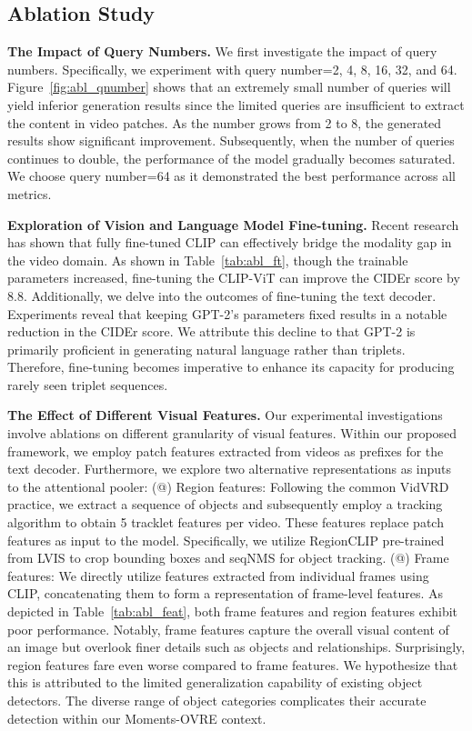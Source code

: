 \documentclass[letterpaper]{article}
\makeatletter
\newcommand{\Rmnum}[1]{\expandafter\@slowromancap\romannumeral #1@}
\makeatother
\begin{document}
\subsection{Ablation Study}
\noindent \textbf{The Impact of Query Numbers. }
We first investigate the impact of query numbers.
Specifically, we experiment with query number=2, 4, 8, 16, 32, and 64.
Figure~\ref{fig:abl_qnumber} shows that an extremely small number of queries will yield inferior generation results since the limited queries are insufficient to extract the content in video patches.
As the number grows from 2 to 8, the generated results show significant improvement.
Subsequently, when the number of queries continues to double, the performance of the model gradually becomes saturated. We choose query number=64 as it demonstrated the best performance across all metrics.

\noindent \textbf{Exploration of Vision and Language Model Fine-tuning.}
Recent research~\cite{Rasheed2023vificlip} has shown that fully fine-tuned CLIP can effectively bridge the modality gap in the video domain.
As shown in Table~\ref{tab:abl_ft}, though the trainable parameters increased, fine-tuning the CLIP-ViT can improve the CIDEr score by 8.8.
Additionally, we delve into the outcomes of fine-tuning the text decoder. Experiments reveal that keeping GPT-2's parameters fixed results in a notable reduction in the CIDEr score. We attribute this decline to that GPT-2 is primarily proficient in generating natural language rather than triplets. Therefore, fine-tuning becomes imperative to enhance its capacity for producing rarely seen triplet sequences.

\noindent \textbf{The Effect of Different Visual Features.}
Our experimental investigations involve ablations on different granularity of visual features. Within our proposed framework, we employ patch features extracted from videos as prefixes for the text decoder. Furthermore, we explore two alternative representations as inputs to the attentional pooler:
(\Rmnum{1}) Region features: Following the common VidVRD practice, we extract a sequence of objects and subsequently employ a tracking algorithm to obtain 5 tracklet features per video. These features replace patch features as input to the model. Specifically, we utilize RegionCLIP \cite{zhong2021regionclip} pre-trained from LVIS to crop bounding boxes and seqNMS \cite{han2016seqnms} for object tracking.
(\Rmnum{2}) Frame features: We directly utilize features extracted from individual frames using CLIP, concatenating them to form a representation of frame-level features.
As depicted in Table~\ref{tab:abl_feat}, both frame features and region features exhibit poor performance. Notably, frame features capture the overall visual content of an image but overlook finer details such as objects and relationships. Surprisingly, region features fare even worse compared to frame features. We hypothesize that this is attributed to the limited generalization capability of existing object detectors. The diverse range of object categories complicates their accurate detection within our Moments-OVRE context.
\end{document}
